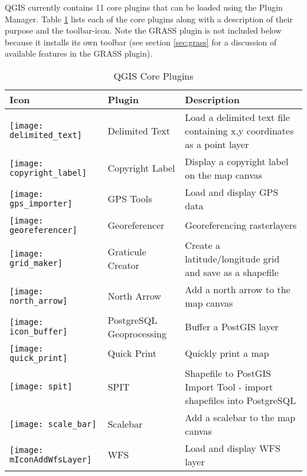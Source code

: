 QGIS currently contains 11 core plugins that can be loaded using the Plugin Manager.
Table \ref{tab:core_plugins} lists each of the core plugins along with a description of their purpose and the toolbar-icon.
Note the GRASS plugin is not included below because it installs its own toolbar (see section \ref{sec:grass} for a discussion of available features in the GRASS plugin).

\begin{minipage}{\textwidth}
\begin{table}[H]
\centering
\caption{QGIS Core Plugins}\label{tab:core_plugins}\medskip
\small
 \begin{tabular}{|l|l|p{4in}|}
\hline \textbf{Icon} & \textbf{Plugin} & \textbf{Description} \\
\hline 
\texttt{[image: delimited\_text]}
 & Delimited Text \index{plugins!delimited text}& Load a delimited text file containing x,y coordinates as a point layer \\
\hline 
\texttt{[image: copyright\_label]}
 & Copyright Label \index{plugins!copyright}& Display a copyright label on the map canvas\\
\hline 
\texttt{[image: gps\_importer]}
 & GPS Tools \index{plugins!gps}& Load and display GPS data \\
\hline
\texttt{[image: georeferencer]}
 & Georeferencer \index{plugin!georeferencer} & Georeferencing rasterlayers \\
\hline
\texttt{[image: grid\_maker]}
 & Graticule Creator \index{plugins!graticule}& Create a latitude/longitude grid and save as a shapefile\\
\hline
\texttt{[image: north\_arrow]}
& North Arrow \index{plugins!north arrow}& Add a north arrow to the map canvas\\
\hline
\texttt{[image: icon\_buffer]}
 & PostgreSQL Geoprocessing \index{plugins!geoprocessing}& Buffer a PostGIS layer \\
\hline
\texttt{[image: quick\_print]}
 & Quick Print \index{plugins!quickprint}& Quickly print a map \\
\hline
\texttt{[image: spit]}
 & SPIT \index{plugins!spit}& Shapefile to PostGIS Import Tool - import shapefiles into PostgreSQL\\
\hline
\texttt{[image: scale\_bar]}
 & Scalebar \index{plugins!scalebar}& Add a scalebar to the map canvas\\
\hline 
\texttt{[image: mIconAddWfsLayer]}
 & WFS & Load and display WFS layer \\
\hline
\end{tabular}
\end{table}
\end{minipage}


